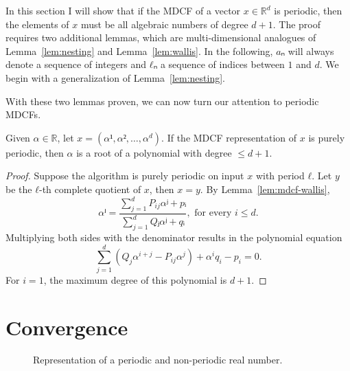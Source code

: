 
In this section I will show that if the MDCF of a vector $x ∈ ℝ^d$ is periodic,
then the elements of $x$ must be all algebraic numbers of degree $d+1$.
The proof requires two additional lemmas, which are multi-dimensional analogues
of Lemma~\ref{lem:nesting} and Lemma~\ref{lem:wallis}.
In the following, $aₙ$ will always denote a sequence of integers and $ℓₙ$ a
sequence of indices between $1$ and $d$.
We begin with a generalization of Lemma~\ref{lem:nesting}.


With these two lemmas proven, we can now turn our attention to periodic MDCFs.

\begin{proposition}
  Given $α ∈ ℝ$, let $x = (α¹, α², …, α^d)$.
  If the MDCF representation of $x$ is purely periodic, then $α$ is a root of a
  polynomial with degree $≤ d+1$.
\end{proposition}

\begin{proof}
  Suppose the algorithm is purely periodic on input $x$ with period $ℓ$.
  Let $y$ be the $ℓ$-th complete quotient of $x$, then $x = y$.
  By Lemma~\ref{lem:mdcf-wallis},
  \[
    αⁱ = \frac{\sum_{j=1}^d P_{ij} αʲ + pᵢ}{\sum_{j=1}^d Qⱼ αʲ + qᵢ}, \text{ for every } i ≤ d.
  \]
  Multiplying both sides with the denominator results in the polynomial equation
  \[
    \sum_{j=1}^d (Q_j α^{i+j} - P_{ij} α^j) + α^i q_i - p_i = 0.
  \]
  For $i = 1$, the maximum degree of this polynomial is $d + 1$.
\end{proof}

\section{Convergence}

\begin{figure}[tb]
  \centering
  
  \caption{
    Representation of a periodic and non-periodic real number.
  }
\end{figure}


